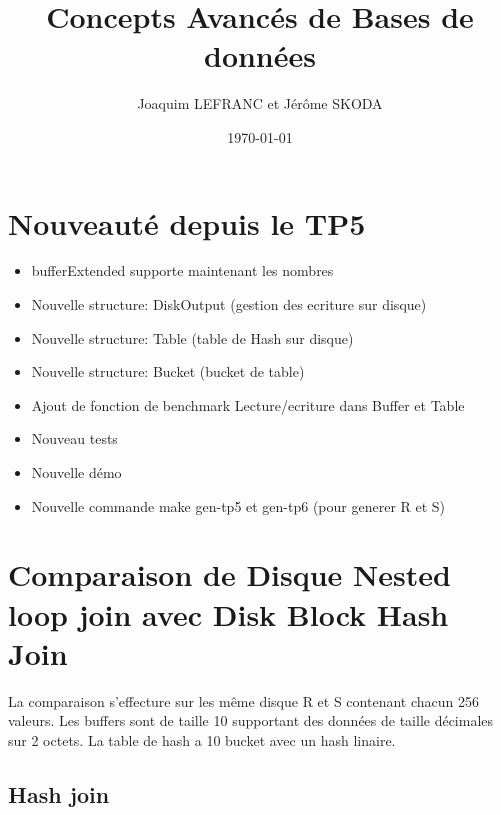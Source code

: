 \documentclass[a4paper]{article}
\title{Concepts Avancés de Bases de données}
\author{Joaquim LEFRANC et Jérôme SKODA}
\date{\today}
\begin{document}
\maketitle


\section{Nouveauté depuis le TP5}

\begin{itemize}
  \item bufferExtended supporte maintenant les nombres
  \item Nouvelle structure: DiskOutput (gestion des ecriture sur disque)
  \item Nouvelle structure: Table  (table de Hash sur disque)
  \item Nouvelle structure: Bucket (bucket de table)
  \item Ajout de fonction de benchmark Lecture/ecriture dans Buffer et Table
  \item Nouveau tests
  \item Nouvelle démo
  \item Nouvelle commande make gen-tp5 et gen-tp6 (pour generer R et S)
\end{itemize}

\section{Comparaison de Disque Nested loop join avec Disk Block Hash Join}

La comparaison s'effecture sur les même disque R et S contenant chacun 256
valeurs. Les buffers sont de taille 10 supportant des données de taille
décimales sur 2 octets. La table de hash a 10 bucket avec un hash linaire.

\subsection{Hash join}
\end{document}
